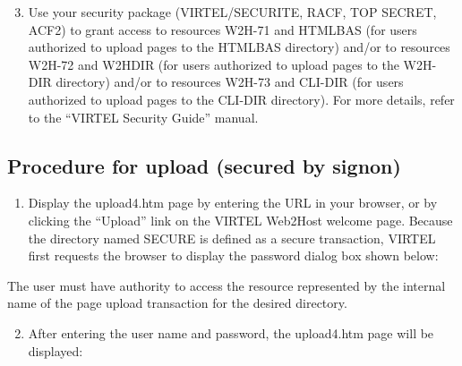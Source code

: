 \documentclass[letterpaper,10pt,english]{sphinxmanual}
\begin{document}
 
\begin{enumerate}
\setcounter{enumi}{2}
\item {} 
Use your security package (VIRTEL/SECURITE, RACF, TOP SECRET, ACF2) to grant access to resources W2H-71 and HTMLBAS (for users authorized to upload pages to the HTMLBAS directory) and/or to resources W2H-72 and W2HDIR (for users authorized to upload pages to the W2H-DIR directory) and/or to resources W2H-73 and CLI-DIR (for users authorized to upload pages to the CLI-DIR directory). For more details, refer to the “VIRTEL Security Guide” manual.

\end{enumerate}


\subsection{Procedure for upload (secured by signon)}
\label{\detokenize{audit_operations_ and_performance:index-58}}\label{\detokenize{audit_operations_ and_performance:procedure-for-upload-secured-by-signon}}\begin{enumerate}
\item {} 
Display the upload4.htm page by entering the URL  in your browser, or by clicking the “Upload” link on the VIRTEL Web2Host welcome page. Because the directory named SECURE is defined as a secure transaction, VIRTEL first requests the browser to display the password dialog box shown below:

\end{enumerate}



The user must have authority to access the resource represented by the internal name of the page upload transaction for the desired directory.
\begin{enumerate}
\setcounter{enumi}{1}
\item {} 
After entering the user name and password, the upload4.htm page will be displayed:

\end{enumerate}
\end{document}
